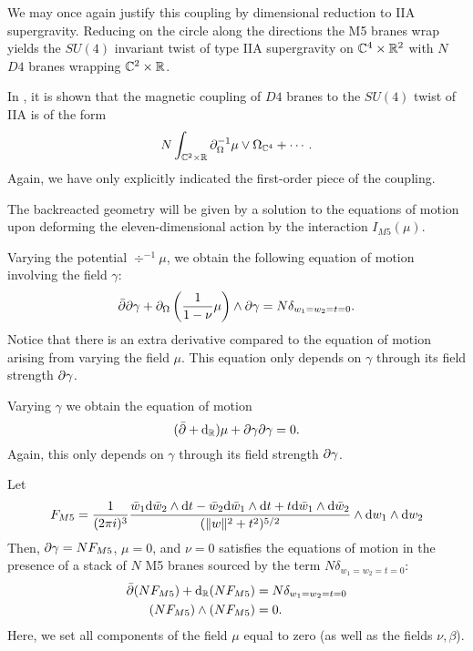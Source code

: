 We may once again justify this coupling by dimensional reduction to IIA supergravity. Reducing on the circle along the directions the M5 branes wrap yields the $SU(4)$ invariant twist of type IIA supergravity on $\mathbb{C}^4 \times \mathbb{R}^2$ with $N$ $D4$ branes wrapping $\mathbb{C}^2 \times \mathbb{R}$. 

In \cite{CLsugra}, it is shown that the magnetic coupling of $D4$ branes to the $SU(4)$ twist of IIA is of the form
\[
N \int _{\mathbb{C}^2 \times \mathbb{R}} \partial_{\Omega}^{-1} \mu \vee \Omega_{\mathbb{C}^4} + \cdots .
\]
Again, we have only explicitly indicated the first-order piece of the coupling. 

\parsec[s:m5backreact]

The backreacted geometry will be given by a solution to the equations of motion upon deforming the eleven-dimensional action by the interaction $I_{M5}(\mu)$. 

Varying the potential $\div^{-1} \mu$, we obtain the following equation of motion involving the field $\gamma$:
\begin{equation}\label{eqn:m5eom1}
\bar{\partial} \partial \gamma + \partial_{\Omega} \left(\frac{1}{1-\nu} \mu\right) \wedge \partial \gamma = N \delta_{w_1=w_2=t=0} .
\end{equation}
Notice that there is an extra derivative compared to the equation of motion arising from varying the field $\mu$. 
This equation only depends on $\gamma$ through its field strength $\partial \gamma$. 

Varying $\gamma$ we obtain the equation of motion 
\begin{equation}\label{eqn:m5eom2}
(\bar{\partial} + \mathrm{d}_{\mathbb{R}}) \mu + \partial \gamma \partial \gamma = 0 .
\end{equation} 
Again, this only depends on $\gamma$ through its field strength $\partial \gamma$.


\begin{lem}
\label{lem:ads7flux}
Let
\[
F_{M5} = \frac{1}{(2\pi i)^3} \frac{\bar{w}_1 \mathrm{d} \bar{w}_2 \wedge \mathrm{d} t - \bar{w}_2 \mathrm{d} \bar{w}_1 \wedge \mathrm{d} t + t \mathrm{d} \bar{w}_1 \wedge \mathrm{d} \bar{w}_2}{(\|w\|^2 + t^2)^{5/2}} \wedge \mathrm{d} w_1 \wedge \mathrm{d} w_2
\]
Then, $\partial\gamma = N F_{M5}$, $\mu = 0$, and $\nu = 0$ satisfies the equations of motion in the presence of a stack of $N$ M5 branes sourced by the term $N \delta_{w_1=w_2=t=0}$:
\begin{align*}
\bar{\partial} (NF_{M5}) + \mathrm{d}_{\mathbb{R}} (NF_{M5}) & = N \delta_{w_1=w_2=t=0}  \\ 
(NF_{M5}) \wedge (NF_{M5}) & = 0 .
\end{align*}
Here, we set all components of the field $\mu$ equal to zero (as well as the fields $\nu,\beta$). 
\end{lem}

